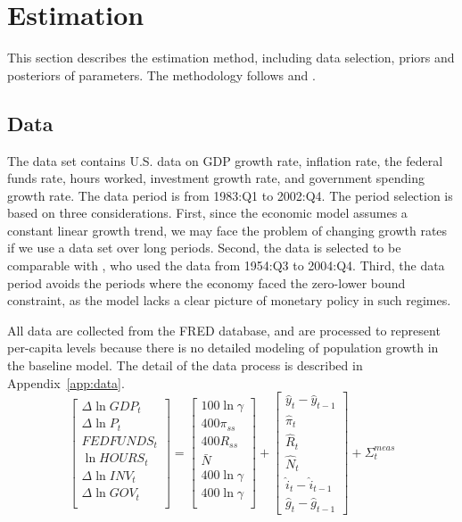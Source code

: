 \section{Estimation}
\label{sec:estimation}
This section describes the estimation method, including data selection, priors and posteriors of parameters. The methodology follows \cite{smetsShocksFrictionsUS2007} and \cite{justinianoInvestmentShocksBusiness2010}.

\subsection{Data}
The data set contains U.S. data on GDP growth rate, inflation rate, the federal funds rate, hours worked, investment growth rate, and government spending growth rate. The data period is from 1983:Q1 to 2002:Q4. The period selection is based on three considerations. First, since the economic model assumes a constant linear growth trend, we may face the problem of changing growth rates if we use a data set over long periods. Second, the data is selected to be comparable with \cite{justinianoInvestmentShocksBusiness2010}, who used the data from 1954:Q3 to 2004:Q4. Third, the data period avoids the periods where the economy faced the zero-lower bound constraint, as the model lacks a clear picture of monetary policy in such regimes.

All data are collected from the FRED database, and are processed to represent per-capita levels because there is no detailed modeling of population growth in the baseline model. The detail of the data process is described in Appendix~\ref{app:data}.
\begin{equation}\label{eq:observation}
    \begin{bmatrix}
        \Delta \ln GDP_t \\
        \Delta \ln P_t \\
        FEDFUNDS_t\\
        \ln HOURS_t \\
        \Delta \ln INV_t \\
        \Delta \ln GOV_t \\
    \end{bmatrix}
    =
    \begin{bmatrix}
        100 \ln \gamma \\
        400\pi_{ss} \\
        400R_{ss} \\
        \bar{N}\\
        400\ln \gamma \\
        400\ln \gamma \\
    \end{bmatrix}
    +
    \begin{bmatrix}
        \hat{y}_t - \hat{y}_{t-1} \\
        \hat{\pi}_t \\
        \hat{R}_t \\
        \hat{N}_t\\
        \hat{i}_t - \hat{i}_{t-1}\\
        \hat{g}_t - \hat{g}_{t-1}
    \end{bmatrix}
    +
    \Sigma_t^{meas}
\end{equation}

